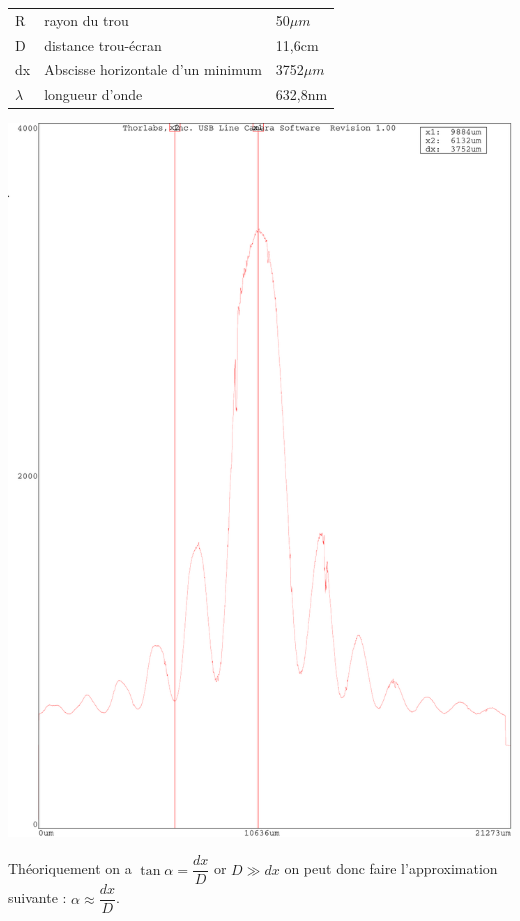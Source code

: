 \documentclass[12pt,a4paper]{article}
\begin{document}
	
	\bgroup
	\setlength{\tabcolsep}{1.5em}
	\def\arraystretch{1.25}
	\begin{tabular}{lll}
		\hline
		\hline
		R &  rayon du trou & 50$\mu m$  \\ 
		D & distance trou-écran &  11,6cm\\ 
		dx& Abscisse horizontale d'un minimum &  3752$\mu m$\\ 
		$\lambda$& longueur d'onde &  632,8nm\\ 
		\hline 
		\hline
	\end{tabular}  
	\egroup
	
	\begin{center}
		\includegraphics[scale=0.35]{res/trou2}
	\end{center}
	Théoriquement on a $\tan\alpha=\dfrac{dx}{D}$ or $D\gg dx$ on peut donc faire l'approximation suivante : $\alpha\approx\dfrac{dx}{D}$.
\end{document}
